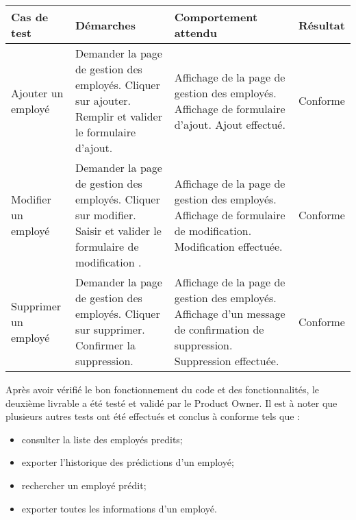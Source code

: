 \begin{tabular}{@{}| p{}| p{5.1 cm}|p{5.2 cm}| >{\centering\arraybackslash}p{}|@{}}

\hline \rowcolor{lightgray} \hspace{1.5pc} \textbf{Cas de test}  & \hspace{1.5pc}  \textbf {Démarches} & \hspace{0.5pc}  \textbf {Comportement attendu} &   \textbf {Résultat} \\

\hline  Ajouter un employé & Demander la page de gestion des employés.\newline
Cliquer sur ajouter.\newline
Remplir et valider le formulaire d'ajout.
& Affichage de la page de gestion des employés.\newline
Affichage de formulaire d'ajout.\newline
Ajout effectué.


& Conforme \\

\hline  Modifier un employé & Demander la page de gestion des employés.\newline
Cliquer sur modifier.\newline \newline
Saisir et valider le formulaire de modification .
& Affichage de la page de gestion des employés.\newline
Affichage de formulaire de modification.\newline
Modification effectuée.


& Conforme \\


\hline  Supprimer un employé & Demander la page de gestion des employés.\newline
Cliquer sur supprimer.\newline\newline
Confirmer la suppression.
& Affichage de la page de gestion des employés.\newline
Affichage d'un message de confirmation de suppression.\newline
Suppression effectuée.


& Conforme \\

\hline

\end{tabular}
\newline
\newline
  Après avoir vérifié le bon fonctionnement du code et des fonctionnalités, le deuxième livrable a
été testé et validé par le Product Owner. Il est à noter que plusieurs autres tests ont été effectués et conclus à conforme tels que :
\begin{itemize}
    \item consulter la liste des employés predits;
    \item exporter l'historique des prédictions d'un employé;
    \item rechercher un employé prédit;
    \item exporter toutes les informations d'un employé.
\end{itemize}

